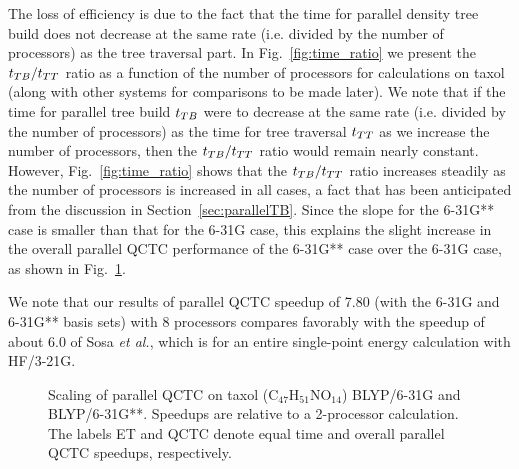 \commentoutA{\documentclass[prl,aps,twocolumn,twocolumngrid,superbib]{revtex4}}
\begin{document}
The loss of efficiency is due to the fact that the time for parallel
density tree build does not decrease at the same rate (i.e.  divided
by the number of processors) as the tree traversal part.  In
Fig.~\ref{fig:time_ratio} we present the $t_{TB}/t_{TT}$ ratio as a
function of the number of processors for calculations on taxol (along
with other systems for comparisons to be made later).  We note that if
the time for parallel tree build $t_{TB}$ were to decrease at the same
rate (i.e. divided by the number of processors) as the time for tree
traversal $t_{TT}$ as we increase the number of processors, then the
$t_{TB}/t_{TT}$ ratio would remain nearly constant.  However,
Fig.~\ref{fig:time_ratio} shows that the $t_{TB}/t_{TT}$ ratio increases
steadily as the number of processors is increased in all cases, a fact
that has been anticipated from the discussion in
Section~\ref{sec:parallelTB}.  Since the slope for the 6-31G** case is
smaller than that for the 6-31G case, this explains the slight
increase in the overall parallel QCTC performance of the 6-31G** case
over the 6-31G case, as shown in Fig.~\ref{fig:taxol}.

We note that our results of parallel QCTC
speedup of 7.80 (with the 6-31G and 6-31G** basis sets) with 8
processors compares favorably with the speedup of about 6.0 of Sosa
{\it et al.}\cite{Sosa_00v26}, which is for an entire single-point
energy calculation with HF/3-21G.

\begin{figure}[t]
\caption{ 
Scaling of parallel QCTC on taxol (C$_{47}$H$_{51}$NO$_{14}$)
BLYP/6-31G and BLYP/6-31G**. Speedups are relative to a 2-processor
calculation.  The labels ET and QCTC denote equal time and overall
parallel QCTC speedups, respectively.
}
\label{fig:taxol}
\end{figure}
\end{document}
